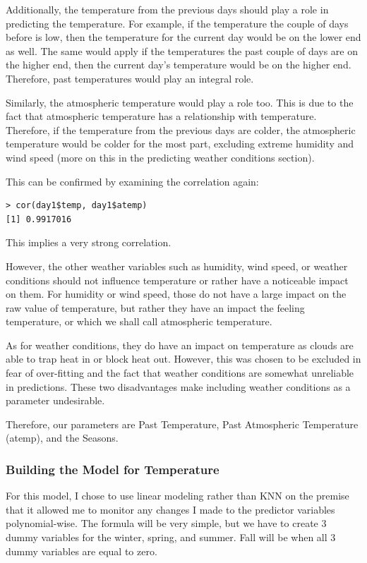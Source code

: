 \documentclass[12pt]{article}
\begin{document}
Additionally, the temperature from the previous days should play a role in predicting the temperature. For example, if the temperature the couple of days before is low, then the temperature for the current day would be on the lower end as well. The same would apply if the temperatures the past couple of days are on the higher end, then the current day's temperature would be on the higher end. Therefore, past temperatures would play an integral role.

Similarly, the atmospheric temperature would play a role too. This is due to the fact that atmospheric temperature has a relationship with temperature. Therefore, if the temperature from the previous days are colder, the atmospheric temperature would be colder for the most part, excluding extreme humidity and wind speed (more on this in the predicting weather conditions section).

This can be confirmed by examining the correlation again:
\begin{verbatim}
> cor(day1$temp, day1$atemp)
[1] 0.9917016
\end{verbatim}
This implies a very strong correlation.

However, the other weather variables such as humidity, wind speed, or weather conditions should not influence temperature or rather have a noticeable impact on them. For humidity or wind speed, those do not have a large impact on the raw value of temperature, but rather they have an impact the feeling temperature, or which we shall call atmospheric temperature. 

As for weather conditions, they do have an impact on temperature as clouds are able to trap heat in or block heat out. However, this was chosen to be excluded in fear of over-fitting and the fact that weather conditions are somewhat unreliable in predictions. These two disadvantages make including weather conditions as a parameter undesirable.

Therefore, our parameters are Past Temperature, Past Atmospheric Temperature (atemp), and the Seasons.

\subsubsection{Building the Model for Temperature}
For this model, I chose to use linear modeling rather than KNN on the premise that it allowed me to monitor any changes I made to the predictor variables polynomial-wise. The formula will be very simple, but we have to create 3 dummy variables for the winter, spring, and summer. Fall will be when all 3 dummy variables are equal to zero.
\end{document}
